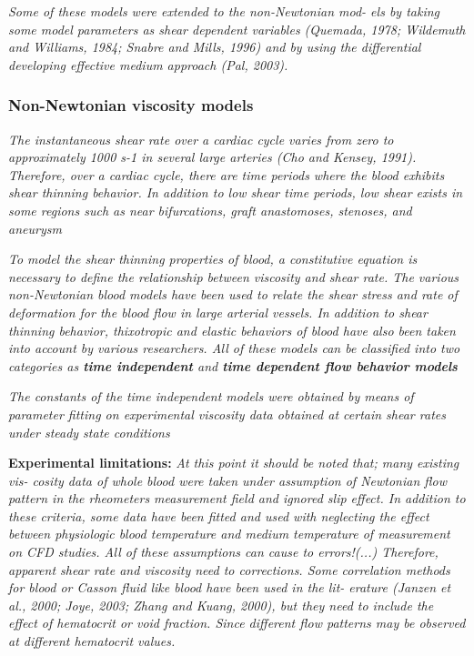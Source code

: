 \documentclass[11pt,letterpaper]{article}
\begin{document}
\textit{Some of these models  were  extended to  the non-Newtonian mod- els by taking some model  parameters as shear dependent variables 
(Quemada, 1978;  Wildemuth and Williams,
1984; Snabre and  Mills, 1996)  and by  using the differential developing effective medium approach (Pal, 2003).}

\subsubsection*{Non-Newtonian viscosity models}
\textit{The instantaneous shear  rate  over  a cardiac cycle  varies from zero to  approximately 1000 s-1 in several large arteries  (Cho  and Kensey,  1991). Therefore, over a  cardiac cycle, there are  time periods where the blood exhibits shear thinning  behavior. In addition  to low  shear time  periods, low shear exists in some  regions such as near bifurcations, graft anastomoses, stenoses, and  aneurysm}



\textit{To model the  shear thinning properties of blood, a constitutive  equation is necessary to  define the relationship between  viscosity  and shear rate. The various non-Newtonian blood models have been  used to relate  the shear stress  and rate of deformation for  the blood flow  in large arterial  vessels. In addition  to shear thinning behavior, thixotropic and  elastic behaviors of blood have also been  taken into account  by various researchers. All of  these models can be  classified  into two categories as \textbf{time  independent}  and \textbf{time dependent flow behavior  models}}

\textit{The constants of the time  independent models were obtained by means of parameter  fitting on  experimental viscosity  data obtained  at certain shear  rates under steady  state  conditions}

\textbf{Experimental limitations:}
\textit{At this point it should  be noted  that; many existing vis-
cosity  data of whole blood were taken under assumption of Newtonian flow pattern in  the rheometers measurement field and ignored slip  effect.  In  addition  to these criteria, some data  have been fitted and  used  with neglecting the effect between physiologic blood temperature and medium temperature  of  measurement on CFD studies. All of these assumptions can cause to  errors!(...) Therefore,  apparent  shear rate  and viscosity need to corrections. Some  correlation methods for blood or  Casson  fluid  like blood  have been used  in the lit- erature (Janzen  et al., 2000; Joye, 2003; Zhang and  Kuang, 2000), but  they need to include the  effect  of hematocrit  or void fraction. Since different flow patterns may be observed at different  hematocrit values.}
\end{document}
